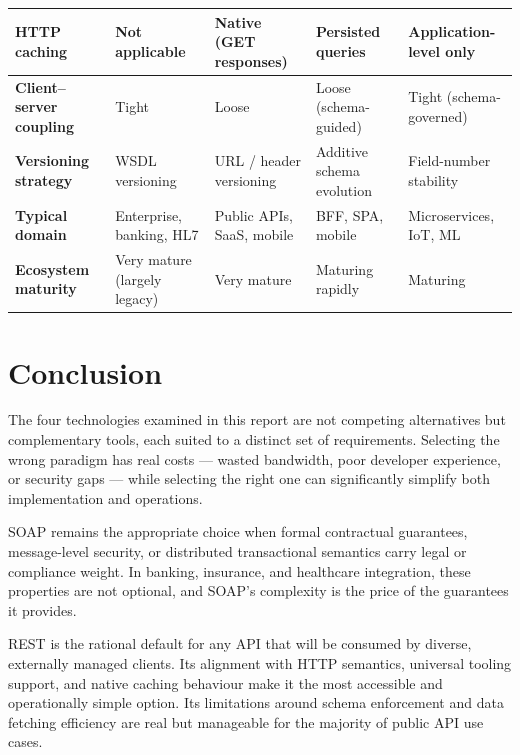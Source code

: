 \documentclass[11pt,a4paper]{article}
\begin{document}
\begin{longtable}{|p{2.6cm}|p{2.85cm}|p{2.85cm}|p{2.85cm}|p{2.85cm}|}
\textbf{HTTP caching}
  & Not applicable
  & Native (GET responses)
  & Persisted queries
  & Application-level only \\
\hline

\textbf{Client--server coupling}
  & Tight
  & Loose
  & Loose (schema-guided)
  & Tight (schema-governed) \\
\hline

\textbf{Versioning strategy}
  & WSDL versioning
  & URL / header versioning
  & Additive schema evolution
  & Field-number stability \\
\hline

\textbf{Typical domain}
  & Enterprise, banking, HL7
  & Public APIs, SaaS, mobile
  & BFF, SPA, mobile
  & Microservices, IoT, ML \\
\hline

\textbf{Ecosystem maturity}
  & Very mature (largely legacy)
  & Very mature
  & Maturing rapidly
  & Maturing \\
\hline

\end{longtable}
\normalsize
\renewcommand{\arraystretch}{1}

\section{Conclusion}

The four technologies examined in this report are not competing alternatives but
complementary tools, each suited to a distinct set of requirements. Selecting the wrong
paradigm has real costs --- wasted bandwidth, poor developer experience, or security
gaps --- while selecting the right one can significantly simplify both implementation and
operations.

SOAP remains the appropriate choice when formal contractual guarantees, message-level
security, or distributed transactional semantics carry legal or compliance weight. In
banking, insurance, and healthcare integration, these properties are not optional, and
SOAP's complexity is the price of the guarantees it provides.

REST is the rational default for any API that will be consumed by diverse, externally
managed clients. Its alignment with HTTP semantics, universal tooling support, and native
caching behaviour make it the most accessible and operationally simple option. Its
limitations around schema enforcement and data fetching efficiency are real but manageable
for the majority of public API use cases.
\end{document}

